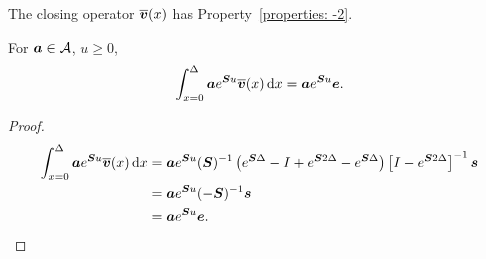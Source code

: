 \begin{lem}
	The closing operator \(\overline{\boldsymbol v}(x)\) has Property~\ref{properties: -2}.
	
	For \(\boldsymbol a \in\mathcal A\), \(u\geq 0\), 
	\[\int_{x=0}^\Delta \boldsymbol a e^{\boldsymbol Su}\overline{\boldsymbol v}(x)\, \mathrm{d} x =\boldsymbol a e^{\boldsymbol Su}\boldsymbol e. \]
\end{lem}
\begin{proof}
	\begin{align*}
		\int_{x=0}^\Delta \boldsymbol a e^{\boldsymbol Su}\overline{\boldsymbol v}(x)\, \mathrm{d} x &= \boldsymbol a  e^{\boldsymbol Su} (\boldsymbol S)^{-1} \left( e^{\boldsymbol S\Delta} - I + e^{\boldsymbol S2\Delta} - e^{\boldsymbol S\Delta}\right)\left[I-e^{\boldsymbol S  2\Delta}\right]^{-1}\boldsymbol s
		\\ &= \boldsymbol a  e^{\boldsymbol Su}(-\boldsymbol S)^{-1}\boldsymbol s
		\\ &= \boldsymbol a  e^{\boldsymbol Su}\boldsymbol e.
	\end{align*}
\end{proof}


